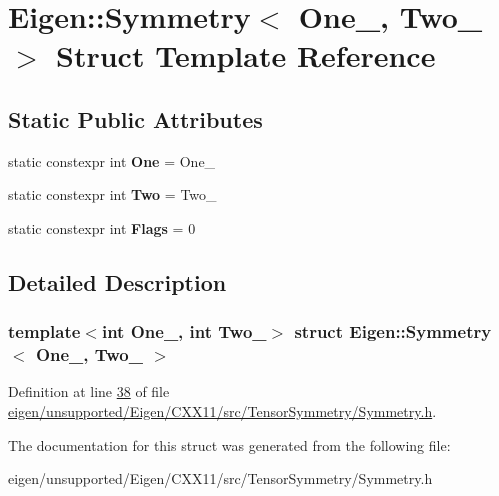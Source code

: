 \hypertarget{struct_eigen_1_1_symmetry}{}\section{Eigen\+:\+:Symmetry$<$ One\+\_\+, Two\+\_\+ $>$ Struct Template Reference}
\label{struct_eigen_1_1_symmetry}
\subsection*{Static Public Attributes}
\begin{DoxyCompactItemize}
\item 
\mbox{\label{struct_eigen_1_1_symmetry_ac88e711e553de1aded06ae14abd46813}} 
static constexpr int {\bfseries One} = One\+\_\+
\item 
\mbox{\label{struct_eigen_1_1_symmetry_ae9122e0ccb3782bbeb284e038cefee89}} 
static constexpr int {\bfseries Two} = Two\+\_\+
\item 
\mbox{\label{struct_eigen_1_1_symmetry_aba5b8422ce020ff5a92825c73f3cd7d6}} 
static constexpr int {\bfseries Flags} = 0
\end{DoxyCompactItemize}


\subsection{Detailed Description}
\subsubsection*{template$<$int One\+\_\+, int Two\+\_\+$>$\newline
struct Eigen\+::\+Symmetry$<$ One\+\_\+, Two\+\_\+ $>$}



Definition at line \hyperlink{eigen_2unsupported_2_eigen_2_c_x_x11_2src_2_tensor_symmetry_2_symmetry_8h_source_l00038}{38} of file \hyperlink{eigen_2unsupported_2_eigen_2_c_x_x11_2src_2_tensor_symmetry_2_symmetry_8h_source}{eigen/unsupported/\+Eigen/\+C\+X\+X11/src/\+Tensor\+Symmetry/\+Symmetry.\+h}.



The documentation for this struct was generated from the following file\+:\begin{DoxyCompactItemize}
\item 
eigen/unsupported/\+Eigen/\+C\+X\+X11/src/\+Tensor\+Symmetry/\+Symmetry.\+h\end{DoxyCompactItemize}
